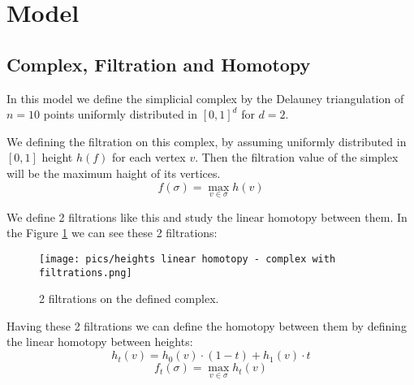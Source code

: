 \documentclass{article}
\begin{document}
\tableofcontents
\newpage

\section{Model}
\subsection{Complex, Filtration and Homotopy}
\par In this model we define the simplicial complex by the Delauney triangulation of $n = 10$ points uniformly distributed in $[0, 1]^d$ for $d = 2$.
\par We defining the filtration on this complex, by assuming uniformly distributed in $[0, 1]$ height $h(f)$ for each vertex $v$. Then the filtration value of the simplex will be the maximum haight of its vertices.
$$
    f(\sigma) = \max_{v\in \sigma} h(v)
$$
\par We define 2 filtrations like this and study the linear homotopy between them. In the Figure \ref{fig:complex} we can see these 2 filtrations:
\begin{figure}[h!]
    \centering
    \texttt{[image: pics/heights linear homotopy - complex with filtrations.png]}
    \caption{2 filtrations on the defined complex.}
    \label{fig:complex}
\end{figure}

\par Having these 2 filtrations we can define the homotopy between them by defining the linear homotopy between heights:
$$
    h_t(v) = h_0(v)\cdot(1 - t) + h_1(v)\cdot t
$$
$$
    f_t(\sigma) = \max_{v\in \sigma} h_t(v)
$$
\end{document}
